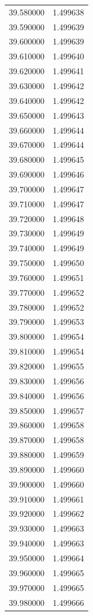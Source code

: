 \begin{tabular}{rr}
39.580000 & 1.499638 \\
39.590000 & 1.499639 \\
39.600000 & 1.499639 \\
39.610000 & 1.499640 \\
39.620000 & 1.499641 \\
39.630000 & 1.499642 \\
39.640000 & 1.499642 \\
39.650000 & 1.499643 \\
39.660000 & 1.499644 \\
39.670000 & 1.499644 \\
39.680000 & 1.499645 \\
39.690000 & 1.499646 \\
39.700000 & 1.499647 \\
39.710000 & 1.499647 \\
39.720000 & 1.499648 \\
39.730000 & 1.499649 \\
39.740000 & 1.499649 \\
39.750000 & 1.499650 \\
39.760000 & 1.499651 \\
39.770000 & 1.499652 \\
39.780000 & 1.499652 \\
39.790000 & 1.499653 \\
39.800000 & 1.499654 \\
39.810000 & 1.499654 \\
39.820000 & 1.499655 \\
39.830000 & 1.499656 \\
39.840000 & 1.499656 \\
39.850000 & 1.499657 \\
39.860000 & 1.499658 \\
39.870000 & 1.499658 \\
39.880000 & 1.499659 \\
39.890000 & 1.499660 \\
39.900000 & 1.499660 \\
39.910000 & 1.499661 \\
39.920000 & 1.499662 \\
39.930000 & 1.499663 \\
39.940000 & 1.499663 \\
39.950000 & 1.499664 \\
39.960000 & 1.499665 \\
39.970000 & 1.499665 \\
39.980000 & 1.499666 \\

\end{tabular}
